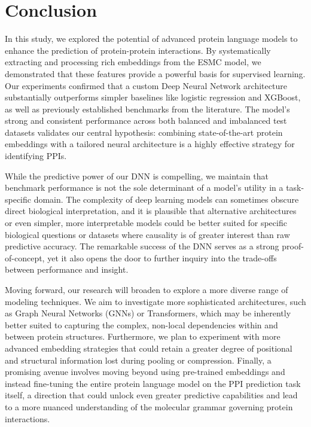 \documentclass{article}
\begin{document}
\section{Conclusion}

In this study, we explored the potential of advanced protein language models to enhance the prediction of protein-protein interactions. By systematically extracting and processing rich embeddings from the ESMC model, we demonstrated that these features provide a powerful basis for supervised learning. Our experiments confirmed that a custom Deep Neural Network architecture substantially outperforms simpler baselines like logistic regression and XGBoost, as well as previously established benchmarks from the literature. 
The model's strong and consistent performance across both balanced and imbalanced test datasets validates our central hypothesis: combining state-of-the-art protein embeddings with a tailored neural architecture is a highly effective strategy for identifying PPIs.

While the predictive power of our DNN is compelling, we maintain that benchmark performance is not the sole determinant of a model's utility in a task-specific domain. The complexity of deep learning models can sometimes obscure direct biological interpretation, and it is plausible that alternative architectures or even simpler, more interpretable models could be better suited for specific biological questions or datasets where causality is of greater interest than raw predictive accuracy. The remarkable success of the DNN serves as a strong proof-of-concept, yet it also opens the door to further inquiry into the trade-offs between performance and insight.

Moving forward, our research will broaden to explore a more diverse range of modeling techniques. We aim to investigate more sophisticated architectures, such as Graph Neural Networks (GNNs) or Transformers, which may be inherently better suited to capturing the complex, non-local dependencies within and between protein structures. Furthermore, we plan to experiment with more advanced embedding strategies that could retain a greater degree of positional and structural information lost during pooling or compression. Finally, a promising avenue involves moving beyond using pre-trained embeddings and instead fine-tuning the entire protein language model on the PPI prediction task itself, a direction that could unlock even greater predictive capabilities and lead to a more nuanced understanding of the molecular grammar governing protein interactions.
\end{document}
